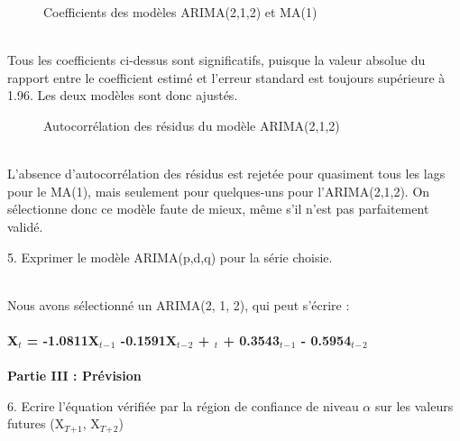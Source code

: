 \documentclass[a4paper, 12pt]{article} %
\begin{document}
\begin{figure}[h]
    \centering
    \caption{Coefficients des modèles ARIMA(2,1,2) et MA(1)}
\end{figure}
\small{
{\\Tous les coefficients ci-dessus sont significatifs, puisque la valeur absolue du rapport entre le coefficient estimé et l'erreur standard est toujours supérieure à 1.96. Les deux modèles sont donc ajustés.
}}
\begin{figure}[h]
    \centering
    \caption{Autocorrélation des résidus du modèle ARIMA(2,1,2)}
\end{figure}
\small{
{\\L'absence d'autocorrélation des résidus est rejetée pour quasiment tous les lags pour le MA(1), mais seulement pour quelques-uns pour l'ARIMA(2,1,2). On sélectionne donc ce modèle faute de mieux, même s'il n'est pas parfaitement validé.
}}
\begin{tcolorbox}
{\normalsize
5. Exprimer le modèle ARIMA(p,d,q) pour la série choisie.}
\end{tcolorbox}
\small{
{\\Nous avons sélectionné un ARIMA(2, 1, 2), qui peut s'écrire :\\ \\ \normalsize{\textbf{X$_t$ = -1.0811X$_t$$_-$$_1$ -0.1591X$_t$$_-$$_2$ + \epsilon$_t$ + 0.3543\epsilon$_t$$_-$$_1$ - 0.5954\epsilon$_t$$_-$$_2$}}
}}\\ \\
\Large{\textbf{Partie III : Prévision}}
\begin{tcolorbox}
{\normalsize
6. Ecrire l’équation vérifiée par la région de confiance de niveau \textbf{$\alpha$} sur les valeurs futures (X$_T$$_+$$_1$, X$_T$$_+$$_2$)}
\end{tcolorbox}
\end{document}
